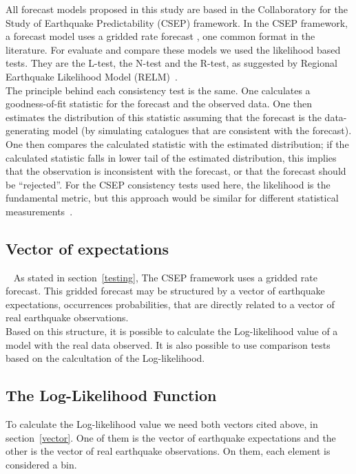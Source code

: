 All forecast models proposed in this study are based in the Collaboratory for the Study of Earthquake Predictability (CSEP) framework. In the CSEP framework, a forecast model uses a gridded rate forecast \cite{zechar2010evaluating}, one common format in the literature. For evaluate and compare these models we used the likelihood based tests. They are the L-test, the N-test and the R-test, as suggested by Regional Earthquake Likelihood Model (RELM)~\cite{schorlemmer2007earthquake}.\\

The principle behind each consistency test is the same. One calculates a goodness-of-fit statistic for the forecast and the observed data. One then estimates the distribution of
this statistic assuming that the forecast is the data-generating model (by simulating catalogues that are consistent with the forecast). One then compares the calculated statistic with the estimated distribution; if the calculated statistic falls in lower tail of the estimated distribution, this implies that the observation is inconsistent with the forecast, or that the forecast should be “rejected”. For the CSEP consistency tests used here, the likelihood is the fundamental metric, but this approach would be similar for different statistical measurements~\cite{eberhard2014multiscale}.\\

\subsection{Vector of expectations}~\label{vector}
As stated in section~\ref{testing}, The CSEP framework uses a gridded rate forecast. This gridded forecast may be structured by a vector of earthquake expectations, occurrences probabilities, that are directly related to a vector of real earthquake observations.\\

Based on this structure, it is possible to calculate the Log-likelihood value of a model with the real data observed. It is also possible to use comparison tests based on the calcultation of the Log-likelihood.\\

\subsection{The Log-Likelihood Function}\label{log-fuction}
To calculate the Log-likelihood value we need both vectors cited above, in section~\ref{vector}. One of them is the vector of earthquake expectations and the other is the vector of real earthquake observations. On them, each element is considered a bin. \\

